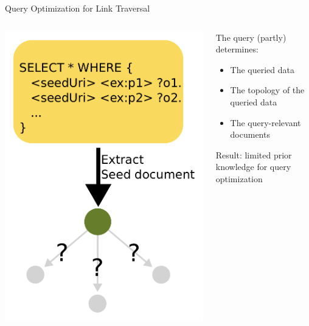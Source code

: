 \begin{frame}{Query Optimization for Link Traversal}
    \begin{columns}[T] %
        \begin{column}{0.6\textwidth} %
            \includegraphics[width=.85\linewidth]{images/hardToOptimizeLTQP.pdf} %
        \end{column}

        \begin{column}{0.4\textwidth}
            The query (partly) determines:
            \begin{itemize}
                \item The queried data
                \item The topology of the queried data
                \item The query-relevant documents
            \end{itemize}
            Result: limited prior knowledge for query optimization
        \end{column}
    \end{columns}
\end{frame}

